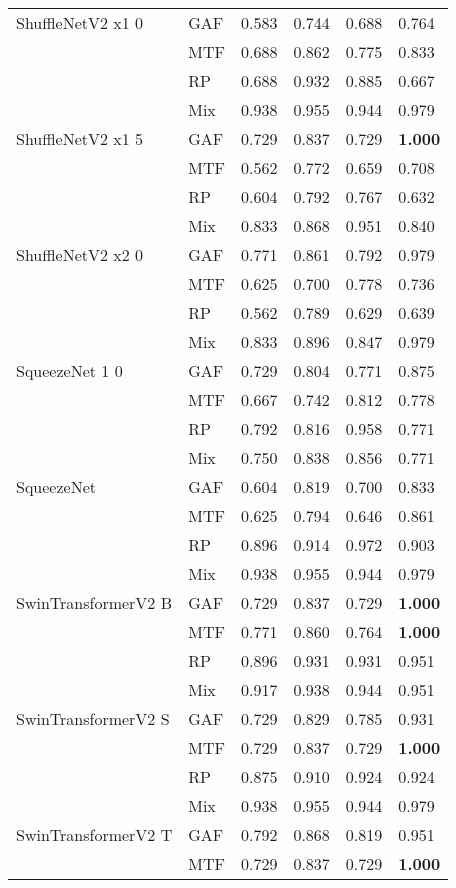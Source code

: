 \begin{longtable}[t]{llllll}
ShuffleNetV2 x1 0 & GAF & 0.583 & 0.744 & 0.688 & 0.764 \\
 & MTF & 0.688 & 0.862 & 0.775 & 0.833 \\
 & RP & 0.688 & 0.932 & 0.885 & 0.667 \\
 & Mix & 0.938 & 0.955 & 0.944 & 0.979 \\
ShuffleNetV2 x1 5 & GAF & 0.729 & 0.837 & 0.729 & \textbf{1.000} \\
 & MTF & 0.562 & 0.772 & 0.659 & 0.708 \\
 & RP & 0.604 & 0.792 & 0.767 & 0.632 \\
 & Mix & 0.833 & 0.868 & 0.951 & 0.840 \\
ShuffleNetV2 x2 0 & GAF & 0.771 & 0.861 & 0.792 & 0.979 \\
 & MTF & 0.625 & 0.700 & 0.778 & 0.736 \\
 & RP & 0.562 & 0.789 & 0.629 & 0.639 \\
 & Mix & 0.833 & 0.896 & 0.847 & 0.979 \\
SqueezeNet 1 0 & GAF & 0.729 & 0.804 & 0.771 & 0.875 \\
 & MTF & 0.667 & 0.742 & 0.812 & 0.778 \\
 & RP & 0.792 & 0.816 & 0.958 & 0.771 \\
 & Mix & 0.750 & 0.838 & 0.856 & 0.771 \\
SqueezeNet & GAF & 0.604 & 0.819 & 0.700 & 0.833 \\
 & MTF & 0.625 & 0.794 & 0.646 & 0.861 \\
 & RP & 0.896 & 0.914 & 0.972 & 0.903 \\
 & Mix & 0.938 & 0.955 & 0.944 & 0.979 \\
SwinTransformerV2 B & GAF & 0.729 & 0.837 & 0.729 & \textbf{1.000} \\
 & MTF & 0.771 & 0.860 & 0.764 & \textbf{1.000} \\
 & RP & 0.896 & 0.931 & 0.931 & 0.951 \\
 & Mix & 0.917 & 0.938 & 0.944 & 0.951 \\
SwinTransformerV2 S & GAF & 0.729 & 0.829 & 0.785 & 0.931 \\
 & MTF & 0.729 & 0.837 & 0.729 & \textbf{1.000} \\
 & RP & 0.875 & 0.910 & 0.924 & 0.924 \\
 & Mix & 0.938 & 0.955 & 0.944 & 0.979 \\
SwinTransformerV2 T & GAF & 0.792 & 0.868 & 0.819 & 0.951 \\
 & MTF & 0.729 & 0.837 & 0.729 & \textbf{1.000} \\

\end{longtable}
